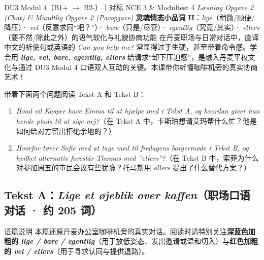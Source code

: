 {DU3 Modul 4（B1+ $\rightarrow$ B2-）｜对标 NCE 3 \& Modultest 4 \textit{Læsning Opgave 2 (Chat) \& Mundtlig Opgave 2 (Paropgave)}}
{\textbf{灵魂情态小品词 II}：\textit{lige}（稍微/顺便/降压）· \textit{vel}（反意求同“吧？”）· \textit{bare}（只是/尽管）· \textit{egentlig}（究竟/其实）· \textit{ellers}（要不然/除此之外）的语气软化与礼貌协商功能}
{在丹麦职场与日常对话中，直译中文的祈使句或英语的 \textit{Can you help me?} 常显得过于生硬，甚至带着命令感。学会用 \textbf{\textit{lige, vel, bare, egentlig, ellers}} 给请求“卸下压迫感”，是融入丹麦平权文化与通过 DU3 Modul 4 口语双人互动的关键。本课带你听懂咖啡机旁的真实协商艺术！}

\begin{foerduleaeser}
带着下面两个问题阅读 Tekst A 和 Tekst B：
\begin{enumerate}
  \item \textit{Hvad vil Kasper have Emma til at hjælpe med i Tekst A, og hvordan giver han hende plads til at sige nej?}（在 Tekst A 中，卡斯珀想请艾玛帮什么忙？他是如何给对方留出拒绝余地的？）
  \item \textit{Hvorfor tøver Sofie med at tage med til fredagens borgermøde i Tekst B, og hvilket alternativ foreslår Thomas med ”ellers”?}（在 Tekst B 中，索菲为什么对参加周五的市民会议有些犹豫？托马斯用 \textit{ellers} 提出了什么替代方案？）
\end{enumerate}
\end{foerduleaeser}


\subsection*{Tekst A：\textit{Lige et øjeblik over kaffen}（职场口语对话 · 约 205 词）}

\begin{tipbox}{语篇说明}
本篇还原丹麦办公室咖啡机旁的真实对话。阅读时请特别关注\textbf{\color{NCDNavy}深蓝色加粗的 \textit{lige / bare / egentlig}}（用于放低姿态、发出邀请或温和切入）与\textbf{\color{NCDRed}红色加粗的 \textit{vel / ellers}}（用于寻求认同与提供退路）。
\end{tipbox}

